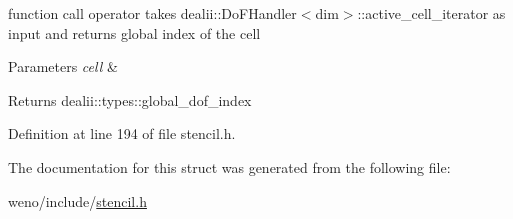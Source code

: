 function call operator takes dealii\+::\+Do\+F\+Handler$<$dim$>$\+::active\+\_\+cell\+\_\+iterator as input and returns global index of the cell 


\begin{DoxyParams}{Parameters}
{\em cell} & \\
\hline
\end{DoxyParams}
\begin{DoxyReturn}{Returns}
dealii\+::types\+::global\+\_\+dof\+\_\+index 
\end{DoxyReturn}


Definition at line 194 of file stencil.\+h.



The documentation for this struct was generated from the following file\+:\begin{DoxyCompactItemize}
\item 
weno/include/\hyperlink{stencil_8h}{stencil.\+h}\end{DoxyCompactItemize}
